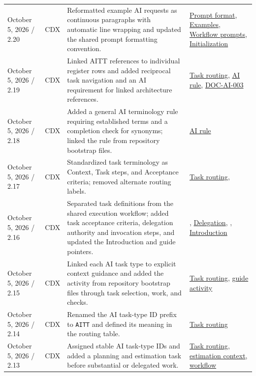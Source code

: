 \begin{tabularx}{\linewidth}{L{3.1cm}L{2.2cm}YL{2.0cm}}
October 5, 2026 / 2.20 & CDX & Reformatted example AI requests as continuous paragraphs with automatic line wrapping and updated the shared prompt formatting convention. & \hyperref[Section:AIPromptFormatting]{Prompt format}, \hyperref[Section:AIExamplePrompts]{Examples}, \hyperref[Section:AIImplementationStart]{Workflow prompts}, \hyperref[Section:InitializeNewProject]{Initialization}\\
October 5, 2026 / 2.19 & CDX & Linked AITT references to individual register rows and added reciprocal task navigation and an AI requirement for linked architecture references. & \hyperref[Table:AISkills]{Task routing}, \hyperref[Rule:AIReferenceLinks]{AI rule}, \hyperref[Requirement:DOCAI003]{DOC-AI-003}\\
October 5, 2026 / 2.18 & CDX & Added a general AI terminology rule requiring established terms and a completion check for synonyms; linked the rule from repository bootstrap files. & \hyperref[Rule:AITerminologyConsistency]{AI rule}\\
October 5, 2026 / 2.17 & CDX & Standardized task terminology as Context, Task steps, and Acceptance criteria; removed alternate routing labels. & \hyperref[Table:AISkills]{Task routing}, \\
October 5, 2026 / 2.16 & CDX & Separated task definitions from the shared execution workflow; added task acceptance criteria, delegation authority and invocation steps, and updated the Introduction and guide pointers. & , \hyperref[Section:AIAgentDelegation]{Delegation}, , \hyperref[Section:InitializeNewProject]{Introduction}\\
October 5, 2026 / 2.15 & CDX & Linked each AI task type to explicit context guidance and added the activity from repository bootstrap files through task selection, work, and checks. & \hyperref[Table:AISkills]{Task routing}, \hyperref[Figure:AIGuideActivity]{guide activity}\\
October 5, 2026 / 2.14 & CDX & Renamed the AI task-type ID prefix to \texttt{AITT} and defined its meaning in the routing table. & \hyperref[Table:AISkills]{Task routing}\\
October 5, 2026 / 2.13 & CDX & Assigned stable AI task-type IDs and added a planning and estimation task before substantial or delegated work. & \hyperref[Table:AISkills]{Task routing}, \hyperref[Section:AIPlanningEstimateContext]{estimation context}, \hyperref[Chapter:AIImplementationWorkflow]{workflow}\\

\end{tabularx}
